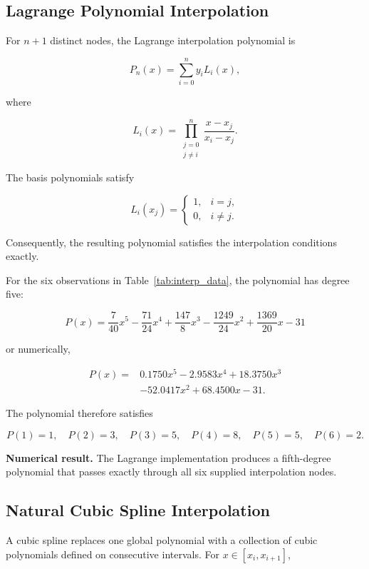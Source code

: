 \documentclass[11pt,a4paper]{article}
\begin{document}
\subsection{Lagrange Polynomial Interpolation}

For $n+1$ distinct nodes, the Lagrange interpolation polynomial is

\[
P_n(x)
=
\sum_{i=0}^{n}
y_iL_i(x),
\]

where

\[
L_i(x)
=
\prod_{\substack{j=0\\j\neq i}}^{n}
\frac{x-x_j}{x_i-x_j}.
\]

The basis polynomials satisfy

\[
L_i(x_j)=
\begin{cases}
1, & i=j,\\
0, & i\neq j.
\end{cases}
\]

Consequently, the resulting polynomial satisfies the interpolation
conditions exactly.

For the six observations in Table~\ref{tab:interp_data}, the polynomial has
degree five:

\[
\boxed{
P(x)=
\frac{7}{40}x^5
-\frac{71}{24}x^4
+\frac{147}{8}x^3
-\frac{1249}{24}x^2
+\frac{1369}{20}x
-31
}
\]

or numerically,

\[
\begin{aligned}
P(x)={}&
0.1750x^5
-2.9583x^4
+18.3750x^3\\
&-52.0417x^2
+68.4500x
-31.
\end{aligned}
\]

The polynomial therefore satisfies

\[
P(1)=1,\quad
P(2)=3,\quad
P(3)=5,\quad
P(4)=8,\quad
P(5)=5,\quad
P(6)=2.
\]

\begin{resultbox}
\textbf{Numerical result.}
The Lagrange implementation produces a fifth-degree polynomial that
passes exactly through all six supplied interpolation nodes.
\end{resultbox}

\subsection{Natural Cubic Spline Interpolation}

A cubic spline replaces one global polynomial with a collection of cubic
polynomials defined on consecutive intervals. For
$x\in[x_i,x_{i+1}]$,
\end{document}
